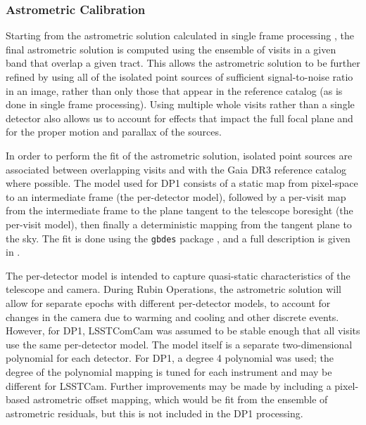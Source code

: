 \subsubsection{Astrometric Calibration}
\label{ssec:global_astrometric_calibration}
Starting from the astrometric solution calculated in single frame processing , the final astrometric solution is computed using the ensemble of visits in a given band that overlap a given \gls{tract}.
This allows the astrometric solution to be further refined by using all of the isolated point sources of sufficient signal-to-noise ratio in an image, rather than only those that appear in the reference catalog (as is done in single frame processing).
Using multiple whole visits rather than a single detector also allows us to account for effects that impact the full focal plane and for the proper motion and parallax of the sources.

In order to perform the fit of the astrometric solution, isolated point sources are associated between overlapping visits and with the Gaia \gls{DR3} reference catalog where possible.
The model used for \gls{DP1} consists of a static map from pixel-space to an intermediate frame (the per-detector model), followed by a per-visit map from the intermediate frame to the plane tangent to the telescope boresight (the per-visit model), then finally a deterministic mapping from the tangent plane to the sky.
The fit is done using the \texttt{gbdes} package \citep{Bernstein2017}, and a full description is given in \citet{dmtn-266}.

The per-detector model is intended to capture quasi-static characteristics of the telescope and \gls{camera}.
During \gls{Rubin Operations}, the astrometric solution will allow for separate epochs with different per-detector models, to account for changes in the camera due to warming and cooling and other discrete events.
However, for \gls{DP1}, \gls{LSSTComCam} was assumed to be stable enough that all visits use the same per-detector model. The model itself is a separate two-dimensional polynomial for each detector.
For \gls{DP1}, a degree 4 polynomial was used; the degree of the polynomial mapping is tuned for each instrument and may be different for LSSTCam.
Further improvements may be made by including a pixel-based astrometric offset mapping, which would be fit from the ensemble of astrometric residuals, but this is not included in the \gls{DP1} processing.

